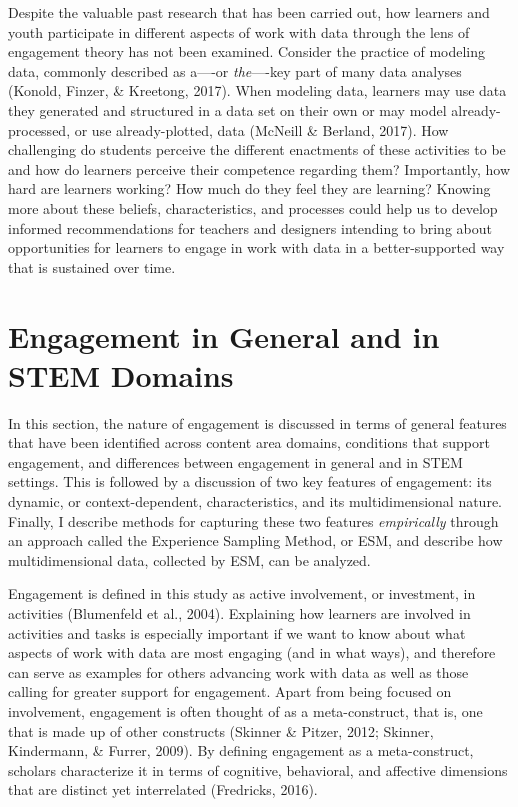 \documentclass[]{msu-thesis}
\theoremstyle{definition}
\theoremstyle{definition}
\theoremstyle{definition}
\theoremstyle{remark}
\begin{document}
Despite the valuable past research that has been carried out, how
learners and youth participate in different aspects of work with data
through the lens of engagement theory has not been examined. Consider
the practice of modeling data, commonly described as a----or
\emph{the}----key part of many data analyses (Konold, Finzer, \&
Kreetong, 2017). When modeling data, learners may use data they
generated and structured in a data set on their own or may model
already-processed, or use already-plotted, data (McNeill \& Berland,
2017). How challenging do students perceive the different enactments of
these activities to be and how do learners perceive their competence
regarding them? Importantly, how hard are learners working? How much do
they feel they are learning? Knowing more about these beliefs,
characteristics, and processes could help us to develop informed
recommendations for teachers and designers intending to bring about
opportunities for learners to engage in work with data in a
better-supported way that is sustained over time.

\section{Engagement in General and in STEM
Domains}\label{engagement-in-general-and-in-stem-domains}

In this section, the nature of engagement is discussed in terms of
general features that have been identified across content area domains,
conditions that support engagement, and differences between engagement
in general and in STEM settings. This is followed by a discussion of two
key features of engagement: its dynamic, or context-dependent,
characteristics, and its multidimensional nature. Finally, I describe
methods for capturing these two features \emph{empirically} through an
approach called the Experience Sampling Method, or ESM, and describe how
multidimensional data, collected by ESM, can be analyzed.

Engagement is defined in this study as active involvement, or
investment, in activities (Blumenfeld et al., 2004). Explaining how
learners are involved in activities and tasks is especially important if
we want to know about what aspects of work with data are most engaging
(and in what ways), and therefore can serve as examples for others
advancing work with data as well as those calling for greater support
for engagement. Apart from being focused on involvement, engagement is
often thought of as a meta-construct, that is, one that is made up of
other constructs (Skinner \& Pitzer, 2012; Skinner, Kindermann, \&
Furrer, 2009). By defining engagement as a meta-construct, scholars
characterize it in terms of cognitive, behavioral, and affective
dimensions that are distinct yet interrelated (Fredricks, 2016).
\end{document}
